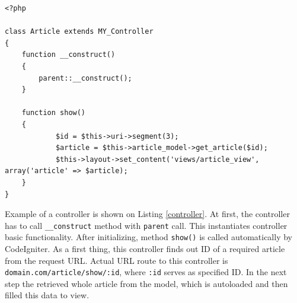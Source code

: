 \begin{lstlisting}[label={controller}, caption={Article controller}]
<?php

class Article extends MY_Controller
{
    function __construct()
    {
        parent::__construct();
    }

    function show()
    {
    		$id = $this->uri->segment(3);
    		$article = $this->article_model->get_article($id);
    		$this->layout->set_content('views/article_view', array('article' => $article);
    }
}
\end{lstlisting}


Example of a controller is shown on Listing \ref{controller}. At first, the controller has to call \texttt{\_\_construct} method with \texttt{parent} call. This instantiates controller basic functionality. After initializing, method \texttt{show()} is called automatically by CodeIgniter. As a first thing, this controller finds out ID of a required article from the request URL. Actual URL route to this controller is \texttt{domain.com/article/show/:id}, where \texttt{:id} serves as specified ID. In the next step the retrieved whole article from the model, which is autoloaded and then  filled this data to view.

